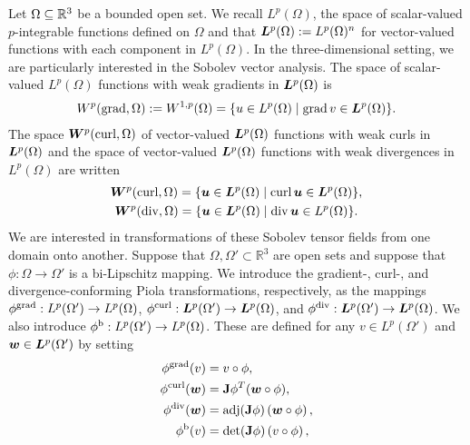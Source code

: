 \documentclass[10pt,a4paper]{article}
\newcommand\cye[1]{%
\protect\leavevmode
\begingroup
    \color{blue}%
    #1%
\endgroup
}
\begin{document}
Let $\Omega \subseteq {\mathbb R}^{3}$ be a bounded open set. 
We recall $L^{p}(\Omega)$, the space of scalar-valued $p$-integrable functions defined on $\Omega$
and that $\bm{L}^{p}(\Omega) := L^{p}(\Omega)^{n}$ for vector-valued functions with each component in $L^{p}(\Omega)$. 
In the three-dimensional setting, we are particularly interested in the Sobolev vector analysis. 
The space of scalar-valued $L^{p}(\Omega)$ functions with weak gradients in $\bm{L}^{p}(\Omega)$ is 
\begin{gather*}
    W^{p}(\grad,\Omega) := W^{1,p}(\Omega) = \{ u \in L^{p}(\Omega) \suchthat \grad v \in \bfL^{p}(\Omega) \}
    .
\end{gather*}
The space $\bm{W}^{p}(\operatorname{curl},\Omega)$ of vector-valued $\bm{L}^{p}(\Omega)$ functions with weak curls in $\bm{L}^{p}(\Omega)$
and the space of vector-valued $\bm{L}^{p}(\Omega)$ functions with weak divergences in $L^{p}(\Omega)$ are written 
\begin{gather*}
    \bfW^{p}(\curl,\Omega) = \{ \bfu \in \bfL^{p}(\Omega) \suchthat \curl \bfu \in \bfL^{p}(\Omega) \},
    \\ 
    \bfW^{p}(\divergence,\Omega) = \{ \bfu \in \bfL^{p}(\Omega) \suchthat \divergence \bfu \in L^{p}(\Omega) \}.
\end{gather*}
We are interested in transformations of these Sobolev tensor fields from one domain onto another. 
Suppose that $\Omega, \Omega' \subset \mathbb{R}^3$ are open sets and suppose that $\phi: \Omega \to \Omega'$ is a bi-Lipschitz mapping.
We introduce the gradient-, curl-, and divergence-conforming Piola transformations, respectively, as the mappings 
$\phi^{\operatorname{grad}}: L^{p}(\Omega') \to L^{p}(\Omega)$,
$\phi^{\operatorname{curl}}: \bm{L}^{p}(\Omega') \to \bm{L}^{p}(\Omega)$, and 
$\phi^{\operatorname{div}}: \bm{L}^{p}(\Omega') \to \bm{L}^{p}(\Omega)$.
We also introduce 
$\phi^{\rm b}: L^{p}(\Omega') \to L^{p}(\Omega)$. 
These are defined 
for any $v \in L^{p}(\Omega')$ and $\bm{w} \in \bm{L}^{p}(\Omega')$ by setting 
\begin{subequations}\label{eq_definition_piola}
\begin{align*}
    \phi^{\operatorname{grad}}(v) &= v \circ \phi, \\
    \phi^{\operatorname{curl}}(\bm{w}) &= {\mathbf{J}}\phi^{T} (\bm{w} \circ \phi), \\
    \phi^{\operatorname{div}}(\bm{w}) &= \operatorname{adj}({\mathbf{J}}\phi) \left( \bm{w} \circ \phi \right), \\  
    \phi^{\rm b}(v) &= \det({\mathbf{J}}\phi) \left( v \circ \phi \right),
\end{align*}
\end{subequations}
\end{document}
